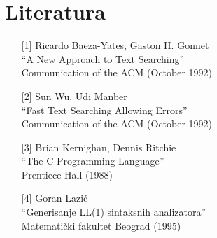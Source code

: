   \section{Literatura}
  \begin{itemize}
    \item[{[1]}]
    {
      Ricardo Baeza-Yates, Gaston H. Gonnet\\
      ``A New Approach to Text Searching''\\
      Communication of the ACM (October 1992)
    }
    \item[{[2]}]
    {
      Sun Wu, Udi Manber\\
      ``Fast Text Searching Allowing Errors''\\
      Communication of the ACM (October 1992)
    }
    \item[{[3]}]
    {
      Brian Kernighan, Dennis Ritchie\\
      ``The C Programming Language''\\
      Prentiece-Hall (1988)
    }
    \item[{[4]}]
    {
      Goran Lazi\'c\\
      ``Generisanje LL(1) sintaksnih analizatora''\\
      Matemati\v{c}ki fakultet Beograd (1995)
    }
  \end{itemize}
%
%

